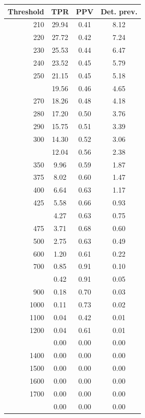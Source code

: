 \documentclass[12pt]{article}
\begin{document}
\begin{minipage}{0.5\textwidth}\small
\begin{tabular}{rccc}
\toprule
\textbf{Threshold} & \textbf{TPR} 
& \textbf{PPV} & \textbf{Det. prev.} \\
\midrule 
    210 & 29.94 & 0.41 & 8.12 \\ 
    220 & 27.72 & 0.42 & 7.24 \\ 
    230 & 25.53 & 0.44 & 6.47 \\ 
    240 & 23.52 & 0.45 & 5.79 \\ 
    250 & 21.15 & 0.45 & 5.18 \\  \addlinespace
    260 & 19.56 & 0.46 & 4.65 \\ 
    270 & 18.26 & 0.48 & 4.18 \\ 
    280 & 17.20 & 0.50 & 3.76 \\ 
    290 & 15.75 & 0.51 & 3.39 \\ 
    300 & 14.30 & 0.52 & 3.06 \\  \addlinespace
    325 & 12.04 & 0.56 & 2.38 \\ 
    350 & 9.96 & 0.59 & 1.87 \\ 
    375 & 8.02 & 0.60 & 1.47 \\ 
    400 & 6.64 & 0.63 & 1.17 \\ 
    425 & 5.58 & 0.66 & 0.93 \\  \addlinespace
    450 & 4.27 & 0.63 & 0.75 \\ 
    475 & 3.71 & 0.68 & 0.60 \\ 
    500 & 2.75 & 0.63 & 0.49 \\ 
    600 & 1.20 & 0.61 & 0.22 \\ 
    700 & 0.85 & 0.91 & 0.10 \\  \addlinespace
    800 & 0.42 & 0.91 & 0.05 \\ 
    900 & 0.18 & 0.70 & 0.03 \\ 
   1000 & 0.11 & 0.73 & 0.02 \\ 
   1100 & 0.04 & 0.42 & 0.01 \\ 
   1200 & 0.04 & 0.61 & 0.01 \\  \addlinespace
   1300 & 0.00 & 0.00 & 0.00 \\ 
   1400 & 0.00 & 0.00 & 0.00 \\ 
   1500 & 0.00 & 0.00 & 0.00 \\ 
   1600 & 0.00 & 0.00 & 0.00 \\ 
   1700 & 0.00 & 0.00 & 0.00 \\  \addlinespace
   1800 & 0.00 & 0.00 & 0.00 \\ 

\end{tabular}
\end{minipage}
\end{document}
